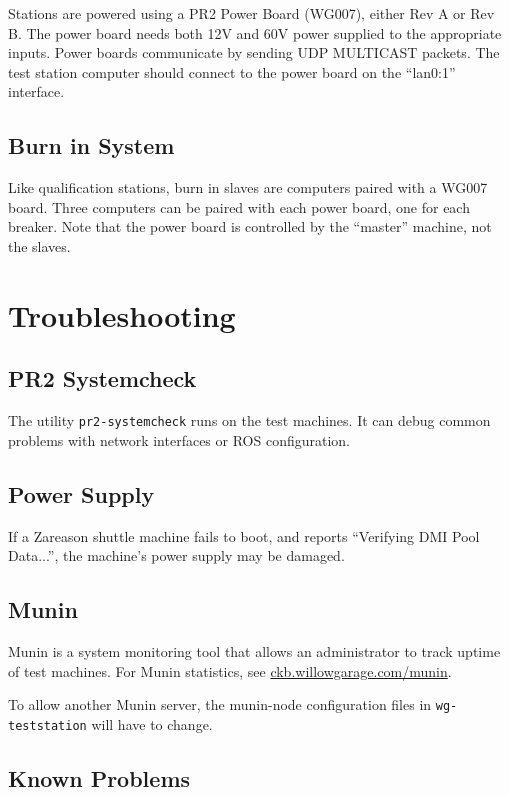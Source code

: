 \documentclass[11pt]{report}
\begin{document}
Stations are powered using a PR2 Power Board (WG007), either Rev A or Rev B. The power board needs both 12V and 60V power supplied to the appropriate inputs. Power boards communicate by sending UDP MULTICAST packets. The test station computer should connect to the power board on the ``lan0:1'' interface.

\subsection{Burn in System}

Like qualification stations, burn in slaves are computers paired with a WG007 board. Three computers can be paired with each power board, one for each breaker. Note that the power board is controlled by the ``master'' machine, not the slaves.

\section{Troubleshooting}

\subsection{PR2 Systemcheck}

The utility \texttt{pr2-systemcheck} runs on the test machines. It can debug common problems with network interfaces or ROS configuration.

\subsection{Power Supply}

If a Zareason shuttle machine fails to boot, and reports ``Verifying DMI Pool Data...'', the machine's power supply may be damaged. 

\subsection{Munin}

Munin is a system monitoring tool that allows an administrator to track uptime of test machines. For Munin statistics, see \href{http://ckb.willowgarage.com/munin}{ckb.willowgarage.com/munin}.

To allow another Munin server, the munin-node configuration files in \texttt{wg-teststation} will have to change.

\subsection{Known Problems}
\end{document}
